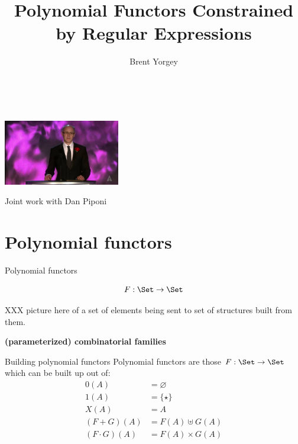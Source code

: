 \documentclass[xcolor=svgnames,12pt]{beamer}
\title{Polynomial Functors Constrained by Regular Expressions}
\date{\theschool \\ \thedate}
\author{Brent Yorgey}
\newenvironment{xframe}[1][]
  {\begin{frame}[fragile,environment=xframe,#1]}
  {\end{frame}}
\renewcommand{\emph}{\textbf}
\begin{document}
\begin{xframe}{}
   \titlepage
\end{xframe}



\begin{xframe}
  \begin{center}
    \includegraphics[width=2in]{dan}

    Joint work with Dan Piponi
  \end{center}
\end{xframe}

\def\sectionimg{dan.jpg}
\section{Polynomial functors}

\begin{xframe}{Polynomial functors}
  \begin{center}
  \[ F : \Set \to \Set \]

  XXX picture here of a set of elements being sent to set of
  structures built from them.

  \emph{(parameterized) combinatorial families}
  \end{center}
\end{xframe}

\begin{xframe}{Building polynomial functors}
  Polynomial functors are those $F : \Set \to \Set$ which can be built
  up out of:
  \begin{align*}
    0(A) &= \varnothing \\
    1(A) &= \{\star\} \\
    X(A) &= A \\
    (F + G)(A) &= F(A) \uplus G(A) \\
    (F \cdot G)(A) &= F(A) \times G(A)
  \end{align*}
\end{xframe}
\end{document}
